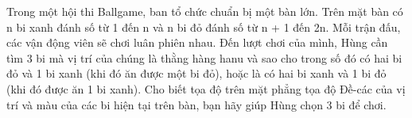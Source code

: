 Trong một hội thi Ballgame, ban tổ chức chuẩn bị một bàn lớn. Trên mặt bàn có n bi xanh đánh số từ 1 đến n và n bi đỏ đánh số từ n + 1 đến 2n. Mỗi trận đấu, các vận động viên sẽ chơi luân phiên nhau. Đến lượt chơi của mình, Hùng cần tìm 3 bi mà vị trí của chúng là thằng hàng hanu và sao cho trong số đó có hai bi đỏ và 1 bi xanh (khi đó ăn được một bi đỏ), hoặc là có hai bi xanh và 1 bi đỏ (khi đó được ăn 1 bi xanh).
Cho biết tọa độ trên mặt phẳng tọa độ Đề-các của vị trí và màu của các bi hiện tại trên bàn, bạn hãy giúp Hùng chọn 3 bi để chơi.